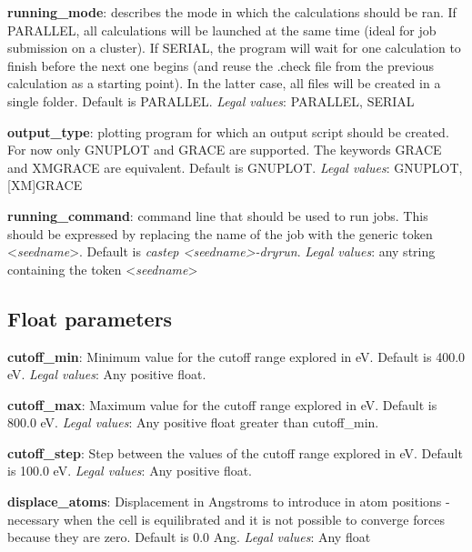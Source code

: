 \documentclass[10pt]{article}
\begin{document}
\textbf{running\_mode}: describes the mode in which the calculations should be ran. If PARALLEL, all calculations will be launched at the same time (ideal for job submission on a cluster). If SERIAL, the program will wait for one calculation to finish before the next one begins (and reuse the .check file from the previous calculation as a starting point). In the latter case, all files will be created in a single folder. Default is PARALLEL.\newline
\textit{Legal values}: PARALLEL, SERIAL\newline

\textbf{output\_type}: plotting program for which an output script should be created. For now only GNUPLOT and GRACE are supported. The keywords GRACE and XMGRACE are equivalent. Default is GNUPLOT.\newline
\textit{Legal values}: GNUPLOT, [XM]GRACE\newline

\textbf{running\_command}: command line that should be used to run jobs. This should be expressed by replacing the name of the job with the generic token \textless \textit{seedname}\textgreater. Default is \textit{castep \textless seedname\textgreater -dryrun}.\newline
\textit{Legal values}: any string containing the token \textless \textit{seedname}\textgreater\newline

\subsection{Float parameters}

\textbf{cutoff\_min}: Minimum value for the cutoff range explored in eV. Default is 400.0 eV.\newline
\textit{Legal values}: Any positive float.\newline

\textbf{cutoff\_max}: Maximum value for the cutoff range explored in eV. Default is 800.0 eV.\newline
\textit{Legal values}: Any positive float greater than cutoff\_min.\newline

\textbf{cutoff\_step}: Step between the values of the cutoff range explored in eV. Default is 100.0 eV.\newline
\textit{Legal values}: Any positive float.\newline

\textbf{displace\_atoms}: Displacement in Angstroms to introduce in atom positions - necessary when the cell is equilibrated and it is not possible to converge forces because they are zero. Default is 0.0 Ang.\newline
\textit{Legal values}: Any float\newline
\end{document}
